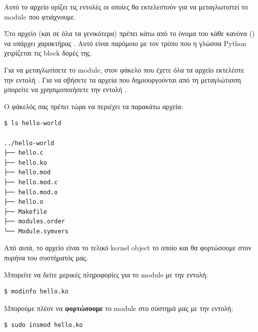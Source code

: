 \documentclass[18pt]{extarticle}
\begin{document}
Αυτό το αρχείο ορίζει τις εντολές οι οποίες θα εκτελεστούν για να μεταγλωτιστεί 
το module που φτιάχνουμε.

\begin{info}[Σημείωση:]
Στο αρχείο  (και σε όλα τα  γενικότερα) πρέπει κάτω από το όνομα του κάθε κανόνα () να υπάρχει χαρακτήρας .
Αυτό είναι παρόμοιο με τον τρόπο που η γλώσσα Python χειρίζεται τις block δομές της.
\end{info}

Για να μεταγλωτίσετε το module, στον φάκελο που έχετε όλα τα αρχείο εκτελέστε την εντολή .
Για να σβήσετε τα αρχεία που δημιουργούνται από τη μεταγλώτισση μπορείτε να χρησιμοποιήσετε την εντολή .

Ο φάκελός σας πρέπει τώρα να περιέχει τα παρακάτω αρχεία:

\begin{commandline}
\begin{verbatim}
$ ls hello-world

../hello-world
├── hello.c
├── hello.ko
├── hello.mod
├── hello.mod.c
├── hello.mod.o
├── hello.o
├── Makefile
├── modules.order
└── Module.symvers
\end{verbatim}
\end{commandline}


Από αυτά, το αρχείο  είναι το τελικό kernel object το οποίο και θα φορτώσουμε στον 
πυρήνα του συστήματός μας. 

Μπορείτε να δείτε μερικές πληροφορίες για το module με την εντολή: 
\begin{commandline}
\begin{verbatim}
$ modinfo hello.ko
\end{verbatim}
\end{commandline}

% 

Μπορούμε πλέον να \textbf{φορτώσουμε} το module στο σύστημά μας με την εντολή:

\begin{commandline}
\begin{verbatim}
$ sudo insmod hello.ko
\end{verbatim}
\end{commandline}
\end{document}
